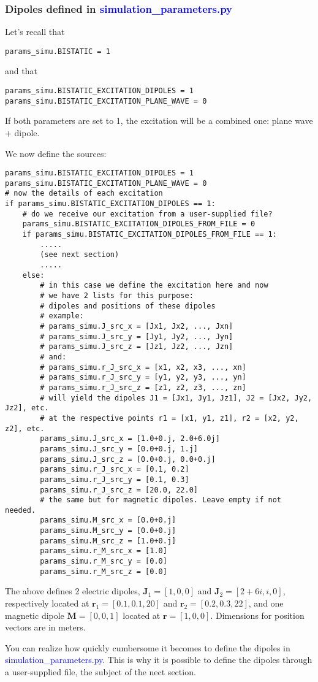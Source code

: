 \documentclass[a4paper,10pt]{book}
\newcommand{\file}[1] {\textcolor{blue}{\textsf{#1}}}
\begin{document}
\subsubsection{Dipoles defined in \file{simulation\_parameters.py}}
%
\par
Let's recall that
\begin{verbatim}
params_simu.BISTATIC = 1
\end{verbatim}
and that
\begin{verbatim}
params_simu.BISTATIC_EXCITATION_DIPOLES = 1
params_simu.BISTATIC_EXCITATION_PLANE_WAVE = 0
\end{verbatim}
If both parameters are set to 1, the excitation will be a combined one: plane wave + dipole.
%
\par
We now define the sources:
\begin{verbatim}
params_simu.BISTATIC_EXCITATION_DIPOLES = 1
params_simu.BISTATIC_EXCITATION_PLANE_WAVE = 0
# now the details of each excitation
if params_simu.BISTATIC_EXCITATION_DIPOLES == 1:
    # do we receive our excitation from a user-supplied file?
    params_simu.BISTATIC_EXCITATION_DIPOLES_FROM_FILE = 0
    if params_simu.BISTATIC_EXCITATION_DIPOLES_FROM_FILE == 1:
        .....
        (see next section)
        .....
    else:
        # in this case we define the excitation here and now
        # we have 2 lists for this purpose: 
        # dipoles and positions of these dipoles
        # example:
        # params_simu.J_src_x = [Jx1, Jx2, ..., Jxn]
        # params_simu.J_src_y = [Jy1, Jy2, ..., Jyn]
        # params_simu.J_src_z = [Jz1, Jz2, ..., Jzn]
        # and:
        # params_simu.r_J_src_x = [x1, x2, x3, ..., xn]
        # params_simu.r_J_src_y = [y1, y2, y3, ..., yn]
        # params_simu.r_J_src_z = [z1, z2, z3, ..., zn]
        # will yield the dipoles J1 = [Jx1, Jy1, Jz1], J2 = [Jx2, Jy2, Jz2], etc.
        # at the respective points r1 = [x1, y1, z1], r2 = [x2, y2, z2], etc.
        params_simu.J_src_x = [1.0+0.j, 2.0+6.0j]
        params_simu.J_src_y = [0.0+0.j, 1.j]
        params_simu.J_src_z = [0.0+0.j, 0.0+0.j]
        params_simu.r_J_src_x = [0.1, 0.2]
        params_simu.r_J_src_y = [0.1, 0.3]
        params_simu.r_J_src_z = [20.0, 22.0]
        # the same but for magnetic dipoles. Leave empty if not needed.
        params_simu.M_src_x = [0.0+0.j]
        params_simu.M_src_y = [0.0+0.j]
        params_simu.M_src_z = [1.0+0.j]
        params_simu.r_M_src_x = [1.0]
        params_simu.r_M_src_y = [0.0]
        params_simu.r_M_src_z = [0.0]
\end{verbatim}
The above defines 2 electric dipoles, $\mathbf{J}_1 = [1, 0, 0]$ and $\mathbf{J}_2 = [2+6i, i, 0]$, respectively located at $\mathbf{r}_1 = [0.1, 0.1, 20]$ and $\mathbf{r}_2 = [0.2, 0.3, 22]$, and one magnetic dipole $\mathbf{M} = [0, 0, 1]$ located at $\mathbf{r} = [1, 0, 0]$. Dimensions for position vectors are in meters.
%
\par
You can realize how quickly cumbersome it becomes to define the dipoles in \file{simulation\_parameters.py}. This is why it is possible to define the dipoles through a user-supplied file, the subject of the nect section.
\end{document}
